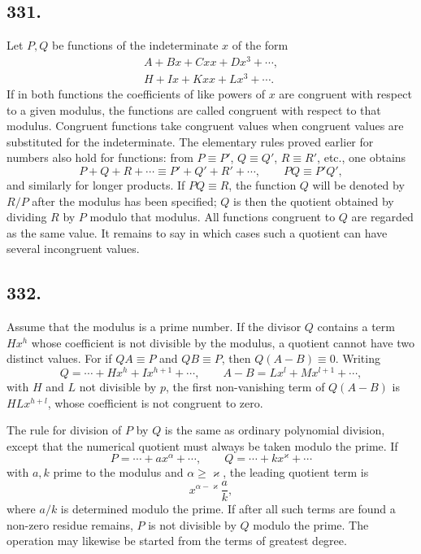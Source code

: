 \documentclass[12pt]{article}
\begin{document}
\subsection*{331.}
Let $P,Q$ be functions of the indeterminate $x$ of the form
\[
\begin{gathered}
A+Bx+Cxx+D x^3+\cdots,\\
H+Ix+Kxx+Lx^3+\cdots .
\end{gathered}
\]
If in both functions the coefficients of like powers of $x$ are congruent with respect to a given modulus, the functions are called congruent with respect to that modulus. Congruent functions take congruent values when congruent values are substituted for the indeterminate. The elementary rules proved earlier for numbers also hold for functions: from $P\equiv P'$, $Q\equiv Q'$, $R\equiv R'$, etc., one obtains
\[
P+Q+R+\cdots\equiv P'+Q'+R'+\cdots,\qquad
PQ\equiv P'Q',
\]
and similarly for longer products. If $PQ\equiv R$, the function $Q$ will be denoted by $R/P$ after the modulus has been specified; $Q$ is then the quotient obtained by dividing $R$ by $P$ modulo that modulus. All functions congruent to $Q$ are regarded as the same value. It remains to say in which cases such a quotient can have several incongruent values.

\subsection*{332.}
Assume that the modulus is a prime number. If the divisor $Q$ contains a term $Hx^h$ whose coefficient is not divisible by the modulus, a quotient cannot have two distinct values. For if $QA\equiv P$ and $QB\equiv P$, then $Q(A-B)\equiv0$. Writing
\[
Q=\cdots+Hx^h+Ix^{h+1}+\cdots,\qquad
A-B=Lx^l+Mx^{l+1}+\cdots,
\]
with $H$ and $L$ not divisible by $p$, the first non-vanishing term of $Q(A-B)$ is $HLx^{h+l}$, whose coefficient is not congruent to zero.

The rule for division of $P$ by $Q$ is the same as ordinary polynomial division, except that the numerical quotient must always be taken modulo the prime. If
\[
P=\cdots+ax^\alpha+\cdots,\qquad Q=\cdots+kx^\varkappa+\cdots
\]
with $a,k$ prime to the modulus and $\alpha\geq\varkappa$, the leading quotient term is
\[
x^{\alpha-\varkappa}\frac{a}{k},
\]
where $a/k$ is determined modulo the prime. If after all such terms are found a non-zero residue remains, $P$ is not divisible by $Q$ modulo the prime. The operation may likewise be started from the terms of greatest degree.
\end{document}
